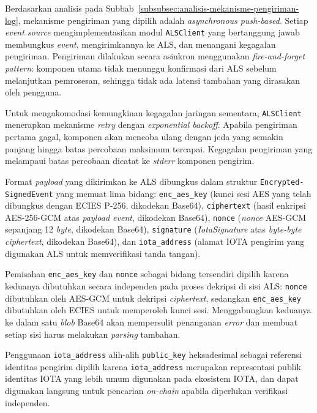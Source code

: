 Berdasarkan analisis pada Subbab~\ref{subsubsec:analisis-mekanisme-pengiriman-log}, mekanisme pengiriman yang dipilih adalah \textit{asynchronous push-based}. Setiap \textit{event source} mengimplementasikan modul \texttt{ALSClient} yang bertanggung jawab membungkus \textit{event}, mengirimkannya ke ALS, dan menangani kegagalan pengiriman. Pengiriman dilakukan secara asinkron menggunakan \textit{fire-and-forget pattern}: komponen utama tidak menunggu konfirmasi dari ALS sebelum melanjutkan pemrosesan, sehingga tidak ada latensi tambahan yang dirasakan oleh pengguna.

Untuk mengakomodasi kemungkinan kegagalan jaringan sementara, \texttt{ALSClient} menerapkan mekanisme \textit{retry} dengan \textit{exponential backoff}. Apabila pengiriman pertama gagal, komponen akan mencoba ulang dengan jeda yang semakin panjang hingga batas percobaan maksimum tercapai. Kegagalan pengiriman yang melampaui batas percobaan dicatat ke \textit{stderr} komponen pengirim.

Format \textit{payload} yang dikirimkan ke ALS dibungkus dalam struktur
\texttt{Encrypted- SignedEvent} yang memuat lima bidang: \texttt{enc\_aes\_key}
(kunci sesi AES yang telah dibungkus dengan ECIES P-256, dikodekan Base64),
\texttt{ciphertext} (hasil enkripsi AES-256-GCM atas \textit{payload event},
dikodekan Base64), \texttt{nonce} (\textit{nonce} AES-GCM sepanjang 12
\textit{byte}, dikodekan Base64), \texttt{signature} (\textit{IotaSignature}
atas \textit{byte-byte ciphertext}, dikodekan Base64), dan \texttt{iota\_address}
(alamat IOTA pengirim yang digunakan ALS untuk memverifikasi tanda tangan).

Pemisahan \texttt{enc\_aes\_key} dan \texttt{nonce} sebagai bidang tersendiri
dipilih karena keduanya dibutuhkan secara independen pada proses dekripsi di sisi
ALS: \texttt{nonce} dibutuhkan oleh AES-GCM untuk dekripsi \textit{ciphertext},
sedangkan \texttt{enc\_aes\_key} dibutuhkan oleh ECIES untuk memperoleh kunci
sesi. Menggabungkan keduanya ke dalam satu \textit{blob} Base64 akan mempersulit
penanganan \textit{error} dan membuat setiap sisi harus melakukan \textit{parsing}
tambahan.

Penggunaan \texttt{iota\_address} alih-alih \texttt{public\_key} heksadesimal
sebagai referensi identitas pengirim dipilih karena \texttt{iota\_address}
merupakan representasi publik identitas IOTA yang lebih umum digunakan pada
ekosistem IOTA, dan dapat digunakan langsung untuk pencarian \textit{on-chain}
apabila diperlukan verifikasi independen.

